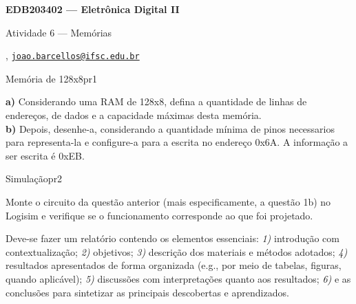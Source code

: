



\usepackage[style=numeric, citestyle=ieee]{biblatex}




\begin{Large}
    \textbf{EDB203402 --- Eletrônica Digital II}
    
    Atividade 6 --- Memórias \hfill {}
\end{Large}

\vspace{1ex}
\textbf{} , \href{mailto:joao.barcellos@ifsc.edu.br}{\texttt{joao.barcellos@ifsc.edu.br}}\\
\textbf{}

\vspace{2ex}

\begin{problem}{Memória de 128x8}{pr1}

\textbf{a)} Considerando uma RAM de 128x8, defina a quantidade de linhas de endereços, de dados e a capacidade máximas desta memória. \\

\textbf{b)} Depois, desenhe-a, considerando a quantidade mínima de pinos necessarios para representa-la e configure-a para a escrita no endereço 0x6A. A informação a ser escrita é 0xEB. \\

\end{problem}

\begin{problem}{Simulação}{pr2}

Monte o circuito da questão anterior (mais especificamente, a questão 1b) no Logisim e verifique se o funcionamento corresponde ao que foi projetado. \\

\end{problem}

\begin{obs}

Deve-se fazer um relatório contendo os elementos essenciais: \textit{1)} introdução com contextualização; \textit{2)} objetivos; \textit{3)} descrição dos materiais e métodos adotados; \textit{4)} resultados apresentados de forma organizada (e.g., por meio de tabelas, figuras, quando aplicável); \textit{5)} discussões com interpretações quanto aos resultados; \textit{6)} e as conclusões para sintetizar as principais descobertas e aprendizados.

\end{obs}

\newpage

\printbibliography


